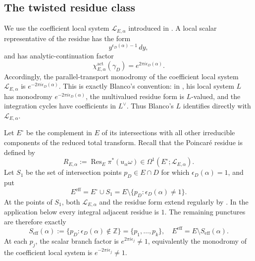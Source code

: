 \documentclass[12pt]{amsart}
\numberwithin{equation}{section}
\theoremstyle{plain}
\theoremstyle{definition}
\theoremstyle{remark}
\theoremstyle{definition}
\DeclareMathOperator{\Res}{Res}
\newcommand{\Z}{\mathbb Z}
\newcommand{\Lcal}{\mathscr L}
\begin{document}
\subsection{The twisted residue class}

We use the coefficient local system $\Lcal_{E,\alpha}$ introduced in . A local scalar representative of the residue has the form
\begin{equation*}
y^{\epsilon_D(\alpha)-1}\,dy,
\end{equation*}
and has analytic-continuation factor
\begin{equation}\label{eq:blanco-actual-character}
\chi_{E,\alpha}^{\mathrm{act}}(\gamma_D)=e^{2\pi i\epsilon_D(\alpha)}.
\end{equation}
Accordingly, the parallel-transport monodromy of the coefficient local system $\Lcal_{E,\alpha}$ is $e^{-2\pi i\epsilon_D(\alpha)}$. This is exactly Blanco's convention: in \cite[Section~7.3]{Blanco2026}, his local system $L$ has monodromy $e^{-2\pi i\epsilon_D(\alpha)}$, the multivalued residue form is $L$-valued, and the integration cycles have coefficients in $L^\vee$. Thus Blanco's $L$ identifies directly with $\Lcal_{E,\alpha}$.

Let $E^\circ$ be the complement in $E$ of its intersections with all other irreducible components of the reduced total transform. Recall that the Poincar\'e residue is defined by
\begin{equation*}
R_{E,\alpha}:=\Res_E\pi^*(u_\alpha\omega)
\in\Omega^1(E^\circ;\Lcal_{E,\alpha}).
\end{equation*}
Let $S_1$ be the set of intersection points $p_D\in E\cap D$ for which $\epsilon_D(\alpha)=1$, and put
\begin{equation*}
E^{\mathrm{eff}}=E^\circ\cup S_1=E\setminus\{p_D:\epsilon_D(\alpha)\ne1\}.
\end{equation*}
At the points of $S_1$, both $\Lcal_{E,\alpha}$ and the residue form extend regularly by . In the application below every integral adjacent residue is $1$. The remaining punctures are therefore exactly
\begin{equation}\label{eq:blanco-effective-punctures}
S_{\mathrm{eff}}(\alpha):=\{p_D:\epsilon_D(\alpha)\notin\Z\}=\{p_1,\ldots,p_k\},\quad E^{\mathrm{eff}}=E\setminus S_{\mathrm{eff}}(\alpha).
\end{equation}
At each $p_j$, the scalar branch factor is $e^{2\pi i\epsilon_j}\ne1$, equivalently the monodromy of the coefficient local system is $e^{-2\pi i\epsilon_j}\ne1$.
\end{document}
